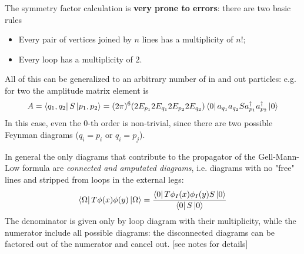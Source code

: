
The symmetry factor calculation is \textbf{very prone to errors}: there are two
basic rules
\begin{itemize}
    \item Every pair of vertices joined by $n$ lines has a multiplicity of $n!$;
    \item Every loop has a multiplicity of $2$.
\end{itemize}

All of this can be generalized to an arbitrary number of in and out particles:
e.g. for two the amplitude matrix element is
$$A=\bra{q_1,q_2}S\ket{p_1,p_2}=(2\pi)^6(2E_{p_1}2E_{q_1}2E_{p_2}2E_{q_2})
\bra{0}a_{q_1}a_{q_2} S a_{p_1}^\dagger a_{p_2}^\dagger\ket{0}
$$
In this case, even the $0$-th order is non-trivial, since there are two possible 
Feynman diagrams ($q_i=p_i$ or $q_i=p_j$).

In general the only diagrams that contribute to the propagator of the
Gell-Mann-Low
formula are \textit{connected and amputated diagrams}, i.e. diagrams with no
"free" lines and stripped from loops in the external legs:
$$\bra{\Omega}T\phi(x)\phi(y)\ket{\Omega} = \frac{\bra{0}T\phi_I(x)\phi_I(y)S
    \ket{0}}{\bra{0}S\ket{0}}$$
The denominator is given only by loop diagram with their multiplicity, while the
numerator include all possible diagrams: the disconnected diagrams can be
factored out of the numerator and cancel out. [see notes for details]
